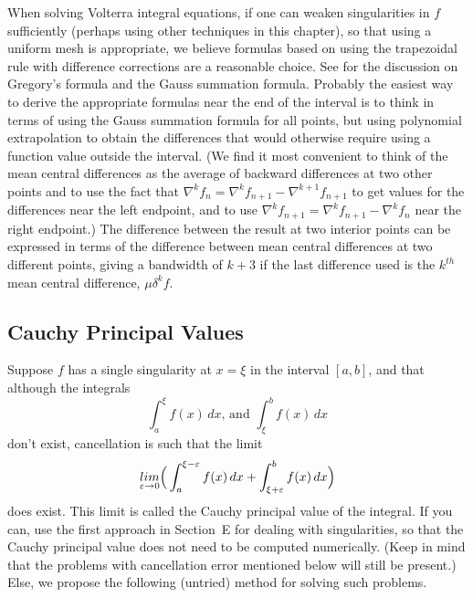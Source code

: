 \documentclass[twoside]{MATH77}
\begin{document}
When solving Volterra integral equations, if one can weaken singularities
in $f$ sufficiently (perhaps using other techniques in this chapter), so
that using a uniform mesh is appropriate, we believe formulas based on
using the trapezoidal rule with difference corrections are a reasonable
choice.  See \cite[pp.~155--156]{Hildebrand:1956:INA} for the discussion
on Gregory's formula and the Gauss summation formula.  Probably the
easiest way to derive the appropriate formulas near the end of the
interval is to think in terms of using the Gauss summation formula for all
points, but using polynomial extrapolation to obtain the differences that
would otherwise require using a function value outside the interval.  (We
find it most convenient to think of the mean central differences as the
average of backward differences at two other points and to use the fact
that $\nabla^k f_n = \nabla^k f_{n+1} - \nabla^{k+1} f_{n+1}$ to get
values for the differences near the left endpoint, and to use $\nabla^k
f_{n+1} = \nabla^k f_{n+1} - \nabla^{k} f_n$ near the right endpoint.) The
difference between the result at two interior points can be expressed in
terms of the difference between mean central differences at two different
points, giving a bandwidth of $k+3$ if the last difference used is the
$k^{th}$ mean central difference, $\mu \delta^k f$.

\subsection{Cauchy Principal Values}\label{cauchy}
Suppose $f$ has a single singularity at $x=\xi$ in the interval
$[a,b]$, and that although the integrals
\begin{equation*}
\int_a^\xi f(x)\,dx\text{, and  }\int_\xi ^b f(x)\,dx
\end{equation*}
don't exist, cancellation is such that the limit
\begin{equation*}
\underset{\varepsilon \rightarrow 0}{lim} \Bigr( \int_a^{\xi-\varepsilon}
f(x)\,dx + \int_{\xi +\varepsilon}^b f(x)\,dx \Bigl)
\end{equation*}
does exist.  This limit is called the Cauchy principal value of the
integral.  If you can, use the first approach in Section~E for dealing with
singularities, so that the Cauchy principal value does not need to be
computed numerically.  (Keep in mind that the problems with
cancellation error mentioned below will still be present.)  Else, we
propose the following (untried) method for solving such problems.
\end{document}
